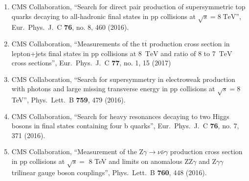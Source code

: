 \begin{itemize}
\begin{enumerate}
\item CMS Collaboration, ``Search for direct pair production of supersymmetric top quarks decaying to all-hadronic final states in pp collisions at $\sqrt{s} = 8\;\text {TeV} $'', Eur.\ Phys.\ J.\ C {\bf 76}, no. 8, 460 (2016).

\item CMS Collaboration, ``Measurements of the $\mathrm{t}\overline{\mathrm{t}}$ production cross section in lepton+jets final states in pp collisions at 8 $\,\text {TeV}$ and ratio of 8 to 7  $\,\text {TeV}$ cross sections'', Eur.\ Phys.\ J.\ C {\bf 77}, no. 1, 15 (2017)

\item CMS Collaboration, ``Search for supersymmetry in electroweak production with photons and large missing transverse energy in pp collisions at $\sqrt s = 8$ TeV'', Phys.\ Lett.\ B {\bf 759}, 479 (2016).

\item CMS Collaboration, ``Search for heavy resonances decaying to two Higgs bosons in final states containing four b quarks'', Eur.\ Phys.\ J.\ C {\bf 76}, no. 7, 371 (2016).

\item CMS Collaboration, ``Measurement of the $ \mathrm{ Z } \gamma \rightarrow \nu \bar{\nu} \gamma$ production cross section in pp collisions at $\sqrt{s}=$ 8 TeV and limits on anomalous $ \mathrm{ ZZ } \gamma$ and $ \mathrm{Z} \gamma \gamma$ trilinear gauge boson couplings'', Phys.\ Lett.\ B {\bf 760}, 448 (2016).


\end{enumerate}
\end{itemize}
